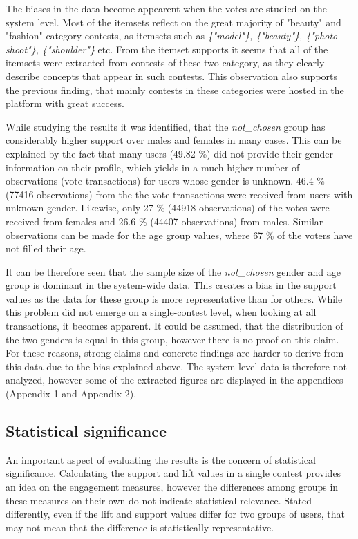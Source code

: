 The biases in the data become appearent when the votes are studied on the system level. Most of the itemsets reflect on the great majority of "beauty" and "fashion" category contests, as itemsets such as \emph{\{"model"\}, \{"beauty"\}, \{"photo shoot"\}, \{"shoulder"\}} etc. From the itemset supports it seems that all of the itemsets were extracted from contests of these two category, as they clearly describe concepts that appear in such contests. This observation also supports the previous finding, that mainly contests in these categories were hosted in the platform with great success.

While studying the results it was identified, that the \emph{not\_chosen} group has considerably higher support over males and females in many cases. This can be explained by the fact that many users (49.82 \%) did not provide their gender information on their profile, which yields in a much higher number of observations (vote transactions) for users whose gender is unknown. 46.4 \% (77416 observations) from the the vote transactions were received from users with unknown gender. Likewise, only 27 \% (44918 observations) of the votes were received from females and 26.6 \% (44407 observations) from males. Similar observations can be made for the age group values, where 67 \% of the voters have not filled their age. 

It can be therefore seen that the sample size of the \emph{not\_chosen} gender and age group is dominant in the system-wide data. This creates a bias in the support values as the data for these group is more representative than for others. While this problem did not emerge on a single-contest level, when looking at all transactions, it becomes apparent. It could be assumed, that the distribution of the two genders is equal in this group, however there is no proof on this claim. For these reasons, strong claims and concrete findings are harder to derive from this data due to the bias explained above. The system-level data is therefore not analyzed, however some of the extracted figures are displayed in the appendices (Appendix 1 and Appendix 2). 


\subsection{Statistical significance}
An important aspect of evaluating the results is the concern of statistical significance. Calculating the support and lift values in a single contest provides an idea on the engagement measures, however the differences among groups in these measures on their own do not indicate statistical relevance. Stated differently, even if the lift and support values differ for two groups of users, that may not mean that the difference is statistically representative.

